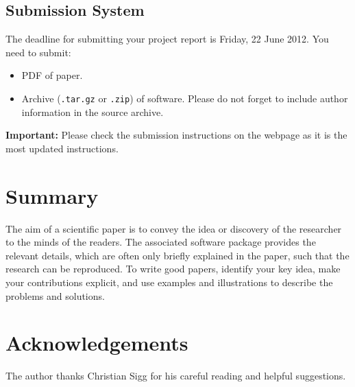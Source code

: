 \documentclass[10pt,conference,compsocconf]{IEEEtran}
\begin{document}
\subsection{Submission System}

The deadline for submitting your project report is Friday, 22 June
2012.
You need to submit:
\begin{itemize}
\item PDF of paper.
\item Archive (\texttt{.tar.gz} or \texttt{.zip}) of software. Please
  do not forget to include author information in the source archive.
\end{itemize}

\textbf{Important:} Please check the submission instructions on the webpage 
as it is the most updated instructions. 

\section{Summary}

The aim of a scientific paper is to convey the idea or discovery of
the researcher to the minds of the readers. The associated software
package provides the relevant details, which are often only briefly
explained in the paper, such that the research can be reproduced.
To write good papers, identify your key idea, make your contributions
explicit, and use examples and illustrations to describe the problems
and solutions.

\section*{Acknowledgements}
The author thanks Christian Sigg for his careful reading and helpful
suggestions.



\end{document}
